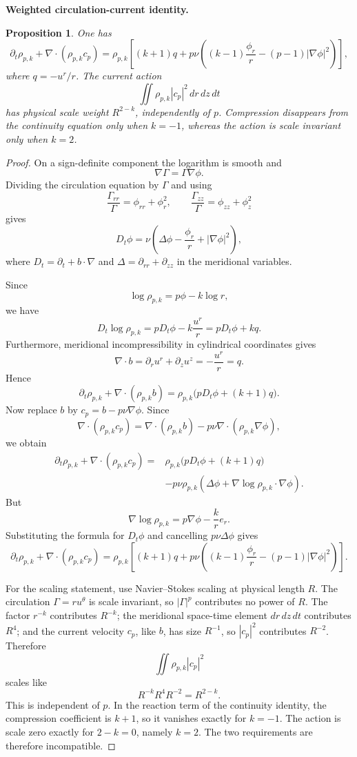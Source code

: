 \documentclass[11pt]{article}
\newtheorem{proposition}[theorem]{Proposition}
\theoremstyle{definition}\newtheorem{definition}[theorem]{Definition}
\theoremstyle{remark}\newtheorem{remark}[theorem]{Remark}
\begin{document}
\medskip
\noindent\textbf{Weighted circulation-current identity.}
\begin{proposition}\label{prop:weighted-current}
One has
\[
\boxed{
\partial_t\rho_{p,k}+\nabla\!\cdot(\rho_{p,k}c_p)
=\rho_{p,k}\left[(k+1)q
+p\nu\left((k-1)\frac{\phi_r}{r}-(p-1)|\nabla\phi|^2\right)\right],
}
\]
where $q=-u^r/r$.  The current action
\[
 \iint\rho_{p,k}|c_p|^2\,dr\,dz\,dt
\]
has physical scale weight $R^{2-k}$, independently of $p$.  Compression disappears from the continuity equation only when $k=-1$, whereas the action is scale invariant only when $k=2$.
\end{proposition}
\begin{proof}
On a sign-definite component the logarithm is smooth and
\[
 \nabla\Gamma=\Gamma\nabla\phi.
\]
Dividing the circulation equation by $\Gamma$ and using
\[
 \frac{\Gamma_{rr}}{\Gamma}=\phi_{rr}+\phi_r^2,
 \qquad
 \frac{\Gamma_{zz}}{\Gamma}=\phi_{zz}+\phi_z^2
\]
gives
\[
 D_t\phi
 =\nu\left(\Delta\phi-\frac{\phi_r}{r}+|\nabla\phi|^2\right),
\]
where $D_t=\partial_t+b\cdot\nabla$ and $\Delta=\partial_{rr}+\partial_{zz}$ in the meridional variables.

Since
\[
 \log\rho_{p,k}=p\phi-k\log r,
\]
we have
\[
 D_t\log\rho_{p,k}
 =pD_t\phi-k\frac{u^r}{r}
 =pD_t\phi+kq.
\]
Furthermore, meridional incompressibility in cylindrical coordinates gives
\[
 \nabla\cdot b=\partial_ru^r+\partial_zu^z=-\frac{u^r}{r}=q.
\]
Hence
\[
 \partial_t\rho_{p,k}+\nabla\cdot(\rho_{p,k}b)
 =\rho_{p,k}\bigl(pD_t\phi+(k+1)q\bigr).
\]
Now replace $b$ by $c_p=b-p\nu\nabla\phi$.  Since
\[
 \nabla\cdot(\rho_{p,k}c_p)
 =\nabla\cdot(\rho_{p,k}b)
 -p\nu\nabla\cdot(\rho_{p,k}\nabla\phi),
\]
we obtain
\[
 \begin{aligned}
 \partial_t\rho_{p,k}+\nabla\cdot(\rho_{p,k}c_p)
 ={}&\rho_{p,k}\bigl(pD_t\phi+(k+1)q\bigr)\\
 &-p\nu\rho_{p,k}
 \left(\Delta\phi+\nabla\log\rho_{p,k}\cdot\nabla\phi\right).
 \end{aligned}
\]
But
\[
 \nabla\log\rho_{p,k}
 =p\nabla\phi-\frac{k}{r}e_r.
\]
Substituting the formula for $D_t\phi$ and cancelling $p\nu\Delta\phi$ gives
\[
 \partial_t\rho_{p,k}+\nabla\cdot(\rho_{p,k}c_p)
 =\rho_{p,k}\left[(k+1)q
 +p\nu\left((k-1)\frac{\phi_r}{r}-(p-1)|\nabla\phi|^2\right)\right].
\]

For the scaling statement, use Navier--Stokes scaling at physical length $R$.  The circulation $\Gamma=ru^\theta$ is scale invariant, so $|\Gamma|^p$ contributes no power of $R$.  The factor $r^{-k}$ contributes $R^{-k}$; the meridional space-time element $dr\,dz\,dt$ contributes $R^4$; and the current velocity $c_p$, like $b$, has size $R^{-1}$, so $|c_p|^2$ contributes $R^{-2}$.  Therefore
\[
 \iint\rho_{p,k}|c_p|^2
\]
scales like
\[
 R^{-k}R^4R^{-2}=R^{2-k}.
\]
This is independent of $p$.  In the reaction term of the continuity identity, the compression coefficient is $k+1$, so it vanishes exactly for $k=-1$.  The action is scale zero exactly for $2-k=0$, namely $k=2$.  The two requirements are therefore incompatible.
\end{proof}
\end{document}
